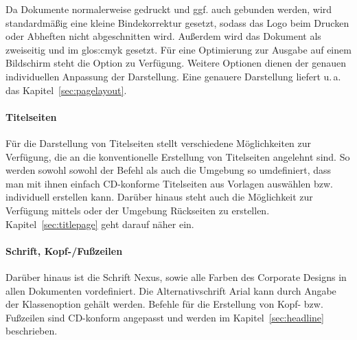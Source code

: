 Da Dokumente normalerweise gedruckt und ggf. auch gebunden werden,
wird standardmäßig eine kleine Bindekorrektur gesetzt, sodass das
Logo beim Drucken oder Abheften nicht abgeschnitten wird.
Außerdem wird das Dokument als zweiseitig und im \gls{glos:cmyk} gesetzt.
Für eine Optimierung zur Ausgabe auf einem Bildschirm steht die Option
 zu Verfügung. Weitere Optionen dienen der
genauen individuellen Anpassung der Darstellung. Eine genauere Darstellung
liefert \mbox{u.\,a.}\xspace das Kapitel~\ref{sec:pagelayout}.

\paragraph{Titelseiten}

Für die Darstellung von Titelseiten stellt \tubslatex verschiedene Möglichkeiten
zur Verfügung, die an die konventionelle Erstellung von Titelseiten angelehnt
sind. So werden sowohl sowohl der Befehl  als auch die Umgebung
 so umdefiniert, dass man mit ihnen einfach CD-konforme
Titelseiten aus Vorlagen auswählen bzw. individuell erstellen kann.
Darüber hinaus steht auch die Möglichkeit zur Verfügung mittels
 oder der Umgebung 
Rückseiten zu erstellen. Kapitel~\ref{sec:titlepage} geht darauf näher ein.
\bigskip


\paragraph{Schrift, Kopf-/Fußzeilen}

Darüber hinaus ist die Schrift Nexus, sowie alle Farben des Corporate Designs
in allen Dokumenten vordefiniert. Die Alternativschrift Arial kann durch
Angabe der Klassenoption  gehält werden.
Befehle für die Erstellung von Kopf- bzw. Fußzeilen sind CD-konform angepasst und
werden im Kapitel~\ref{sec:headline} beschrieben.


